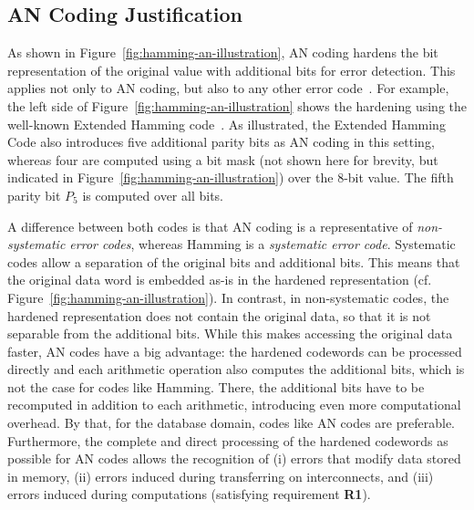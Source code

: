 \subsection{AN Coding Justification}
\label{sec:ANCodingJustification}

As shown in Figure~\ref{fig:hamming-an-illustration}, AN coding hardens the bit representation of the original value with additional bits for error detection. This applies not only to AN coding, but also to any other error code~\cite{moon2005error}. For example, the left side of Figure~\ref{fig:hamming-an-illustration} shows the hardening using the well-known Extended Hamming code~\cite{hamming1950error}. As illustrated, the Extended Hamming Code also introduces five additional parity bits as AN coding in this setting, whereas four are computed using a bit mask (not shown here for brevity, but indicated in Figure~\ref{fig:hamming-an-illustration}) over the $8$-bit value. The fifth parity bit $P_5$ is computed over all bits. 

A difference between both codes is that AN coding is a representative of \emph{non-systematic error codes}, whereas Hamming is a \emph{systematic error code}. Systematic codes allow a separation of the original bits and additional bits. This means that the original data word is embedded as-is in the hardened representation (cf. Figure~\ref{fig:hamming-an-illustration}). In contrast, in non-systematic codes, the hardened representation does not contain the original data, so that it is not separable from the additional bits. While this makes accessing the original data faster, AN codes have a big advantage: the hardened codewords can be processed directly and each arithmetic operation also computes the additional bits, which is not the case for codes like Hamming. There, the additional bits have to be recomputed in addition to each arithmetic, introducing even more computational overhead. By that, for the database domain, codes like AN codes are preferable. Furthermore, the complete and direct processing of the hardened codewords as possible for AN codes allows the recognition of (i) errors that modify data stored in memory, (ii) errors induced during transferring on interconnects, and (iii) errors induced during computations (satisfying requirement \textbf{R1}). 

